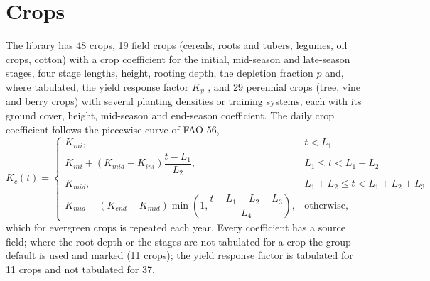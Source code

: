 \section{Crops}
The library has 48 crops, 19 field crops (cereals, roots and tubers, legumes, oil crops, cotton) with a crop coefficient for the initial, mid-season and late-season stages, four stage lengths, height, rooting depth, the depletion fraction $p$ and, where tabulated, the yield response factor $K_y$ \citep{Doorenbos1979,Allen1998}, and 29 perennial crops (tree, vine and berry crops) with several planting densities or training systems, each with its ground cover, height, mid-season and end-season coefficient. The daily crop coefficient follows the piecewise curve of FAO-56,
\begin{equation}\label{eq:kc}
K_c(t)=\begin{cases}K_{ini}, & t<L_1\\ K_{ini}+(K_{mid}-K_{ini})\dfrac{t-L_1}{L_2}, & L_1\le t<L_1+L_2\\ K_{mid}, & L_1+L_2\le t<L_1+L_2+L_3\\ K_{mid}+(K_{end}-K_{mid})\min\!\left(1,\dfrac{t-L_1-L_2-L_3}{L_4}\right), & \text{otherwise,}\end{cases}
\end{equation}
which for evergreen crops is repeated each year. Every coefficient has a source field; where the root depth or the stages are not tabulated for a crop the group default is used and marked (11 crops); the yield response factor is tabulated for 11 crops and not tabulated for 37.

